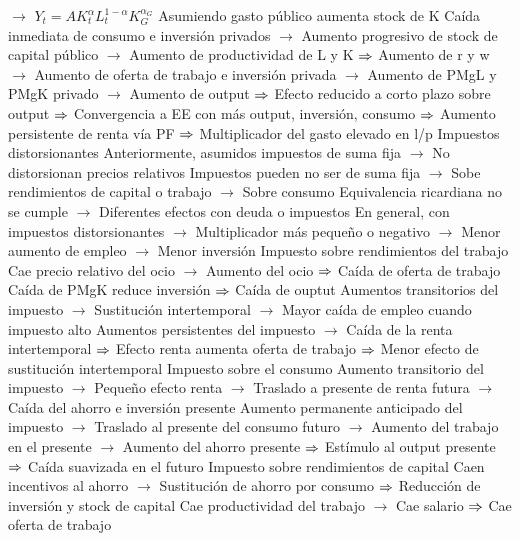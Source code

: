 \documentclass{nuevotema}
\begin{document}
\begin{esquemal}
				\4[] $\to$ $Y_t = A K_t^\alpha L_t^{1-\alpha} K_G^{\alpha_G}$
				\4[] Asumiendo gasto público aumenta stock de K
				\4[] Caída inmediata de consumo e inversión privados
				\4[] $\to$ Aumento progresivo de stock de capital público
				\4[] $\to$ Aumento de productividad de L y K
				\4[] $\Rightarrow$ Aumento de r y w
				\4[] $\to$ Aumento de oferta de trabajo e inversión privada
				\4[] $\to$ Aumento de PMgL y PMgK privado
				\4[] $\to$ Aumento de output
				\4[] $\Rightarrow$ Efecto reducido a corto plazo sobre output
				\4[] $\Rightarrow$ Convergencia a EE con más output, inversión, consumo
				\4[] $\Rightarrow$ Aumento persistente de renta vía PF
				\4[] $\Rightarrow$ Multiplicador del gasto elevado en l/p
				\4 Impuestos distorsionantes
				\4[] Anteriormente, asumidos impuestos de suma fija
				\4[] $\to$ No distorsionan precios relativos
				\4[] Impuestos pueden no ser de suma fija
				\4[] $\to$ Sobe rendimientos de capital o trabajo
				\4[] $\to$ Sobre consumo
				\4[] Equivalencia ricardiana no se cumple
				\4[] $\to$ Diferentes efectos con deuda o impuestos
				\4[] En general, con impuestos distorsionantes
				\4[] $\to$ Multiplicador más pequeño o negativo
				\4[] $\to$ Menor aumento de empleo
				\4[] $\to$ Menor inversión
				\4 Impuesto sobre rendimientos del trabajo
				\4[] Cae precio relativo del ocio
				\4[] $\to$ Aumento del ocio
				\4[] $\Rightarrow$ Caída de oferta de trabajo
				\4[] Caída de PMgK reduce inversión
				\4[] $\Rightarrow$ Caída de ouptut
				\4[] Aumentos transitorios del impuesto
				\4[] $\to$ Sustitución intertemporal
				\4[] $\to$ Mayor caída de empleo cuando impuesto alto
				\4[] Aumentos persistentes del impuesto
				\4[] $\to$ Caída de la renta intertemporal
				\4[] $\Rightarrow$ Efecto renta aumenta oferta de trabajo
				\4[] $\Rightarrow$ Menor efecto de sustitución intertemporal
				\4 Impuesto sobre el consumo
				\4[] Aumento transitorio del impuesto
				\4[] $\to$ Pequeño efecto renta
				\4[] $\to$ Traslado a presente de renta futura
				\4[] $\to$ Caída del ahorro e inversión presente
				\4[] Aumento permanente anticipado del impuesto
				\4[] $\to$ Traslado al presente del consumo futuro
				\4[] $\to$ Aumento del trabajo en el presente
				\4[] $\to$ Aumento del ahorro presente
				\4[] $\Rightarrow$ Estímulo al output presente
				\4[] $\Rightarrow$ Caída suavizada en el futuro
				\4 Impuesto sobre rendimientos de capital
				\4[] Caen incentivos al ahorro
				\4[] $\to$ Sustitución de ahorro por consumo
				\4[] $\Rightarrow$ Reducción de inversión y stock de capital
				\4[] Cae productividad del trabajo
				\4[] $\to$ Cae salario
				\4[] $\Rightarrow$ Cae oferta de trabajo

\end{esquemal}
\end{document}
